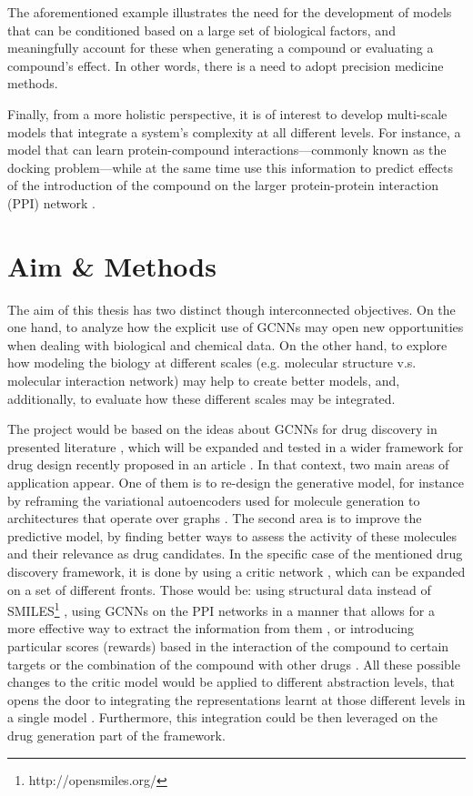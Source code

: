 \documentclass{article}
\begin{document}
The aforementioned example illustrates the need for the development of models that can
 be conditioned based on a large set of biological factors, and meaningfully account for
 these when generating a compound or evaluating a compound's effect. In other words,
 there is a need to adopt precision medicine methods.

Finally, from a more holistic perspective, it is of interest to develop multi-scale
 models that integrate a system's complexity at all different levels. For instance, a
 model that can learn protein-compound interactions---commonly known as the docking
 problem---while at the same time use this information to predict effects of the
 introduction of the compound on the larger protein-protein interaction (PPI) network
 \cite{Sun2019}.


    \section*{Aim \& Methods}


The aim of this thesis has two distinct though interconnected objectives. On the one
 hand, to analyze how the explicit use of GCNNs may open new opportunities when dealing
 with biological and chemical data. On the other hand, to explore how modeling the
 biology at different scales (e.g. molecular structure v.s. molecular interaction
 network) may help to create better models, and, additionally, to evaluate how these
 different scales may be integrated.

The project would be based on the ideas about GCNNs for drug discovery in presented
 literature \cite{Sun2019}, which will be expanded and tested in a wider framework for
 drug design recently proposed in an article \cite{Born2019}. In that context, two main
 areas of application appear. One of them is to re-design the generative model, for
 instance by reframing the variational autoencoders used for molecule generation to
 architectures that operate over graphs \cite{Simonovsky2018,Li2018, Li2018a}. The
 second area is to improve the predictive model, by finding better ways to assess the
 activity of these molecules and their relevance as drug candidates. In the specific
 case of the mentioned drug discovery framework, it is done by using a critic network
 \cite{Manica2019}, which can be expanded on a set of different fronts. Those would be:
 using structural data instead of SMILES\footnote{http://opensmiles.org/} \cite{Li,
 Do2019}, using GCNNs on the PPI networks in a manner that allows for a more effective
 way to extract the information from them \cite{Oskooei2019, Wang2019}, or introducing
 particular scores (rewards) based in the interaction of the compound to certain targets
 \cite{YingkaiGao2018, Zhavoronkov2019} or the combination of the compound with other
 drugs \cite{Zitnik2018}. All these possible changes to the critic model would be
 applied to different abstraction levels, that opens the door to integrating the
 representations learnt at those different levels in a single model \cite{Ying2018,
 Ma2019, Huang2019}. Furthermore, this integration could be then leveraged on the drug
 generation part of the framework.
\end{document}
